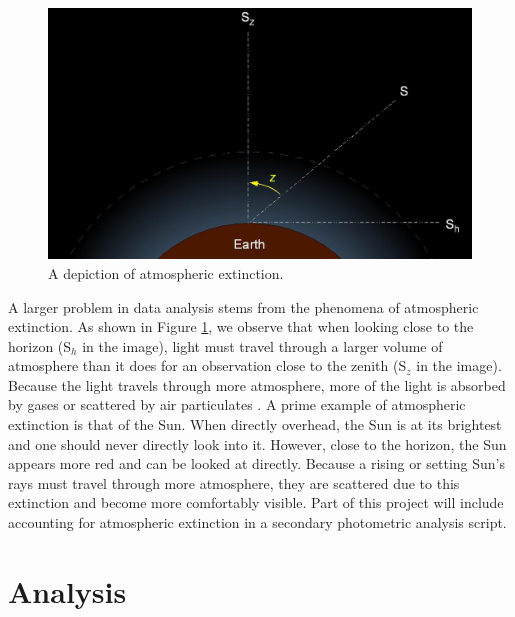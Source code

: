 \begin{figure}[ht!]
  \centering
  \includegraphics[scale=0.4]{images/extinction.JPG}
  \caption{A depiction of atmospheric extinction.}
  \label{extinc}
\end{figure}

A larger problem in data analysis stems from the phenomena of atmospheric extinction.
As shown in Figure \ref{extinc}, we observe that when looking close to the horizon (S$_h$ in the image), light must travel through a larger volume of atmosphere than it does for an observation close to the zenith (S$_z$ in the image).  
Because the light travels through more atmosphere, more of the light is absorbed by gases or scattered by air particulates \cite{noauthor_atmospheric_nodate}.
A prime example of atmospheric extinction is that of the Sun. 
When directly overhead, the Sun is at its brightest and one should never directly look into it.
However, close to the horizon, the Sun appears more red and can be looked at directly.
Because a rising or setting Sun's rays must travel through more atmosphere, they are scattered due to this extinction and become more comfortably visible.
Part of this project will include accounting for atmospheric extinction in a secondary photometric analysis script.

\section{Analysis}

